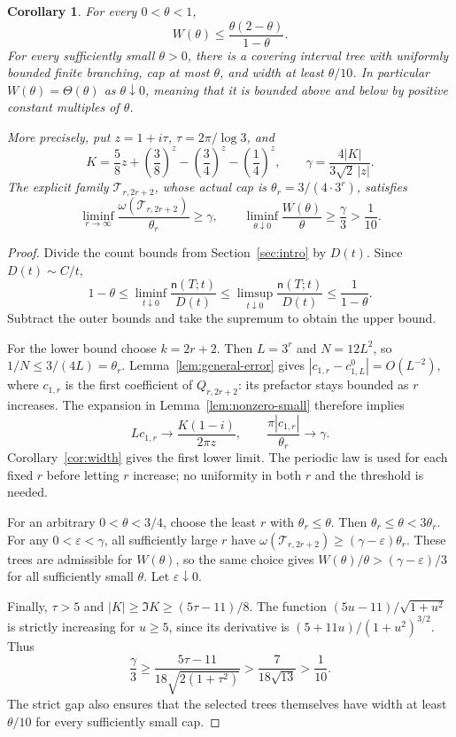 \documentclass[11pt]{article}
\newtheorem{corollary}[theorem]{Corollary}
\theoremstyle{definition}
\theoremstyle{remark}
\newcommand{\cyl}{\mathcal T}
\newcommand{\ncount}{\mathsf n}
\begin{document}
\begin{corollary}\label{cor:theta-order}
For every $0<\theta<1$,
\[
 W(\theta)\le\frac{\theta(2-\theta)}{1-\theta}.
\]
For every sufficiently small $\theta>0$, there is a covering interval
tree with uniformly bounded finite branching, cap at most $\theta$, and
width at least $\theta/10$. In particular $W(\theta)=\Theta(\theta)$ as
$\theta\downarrow0$, meaning that it is bounded above and below by
positive constant multiples of $\theta$.

More precisely, put $z=1+i\tau$, $\tau=2\pi/\log3$, and
\[
 K=\frac58z+\left(\frac38\right)^z
       -\left(\frac34\right)^z-\left(\frac14\right)^z,
 \qquad \gamma=\frac{4|K|}{3\sqrt2\,|z|}.
\]
The explicit family $\cyl_{r,2r+2}$, whose actual cap is
$\theta_r=3/(4\cdot3^r)$, satisfies
\[
 \liminf_{r\to\infty}\frac{\omega(\cyl_{r,2r+2})}{\theta_r}\ge\gamma,
 \qquad
 \liminf_{\theta\downarrow0}\frac{W(\theta)}{\theta}
 \ge\frac\gamma3>\frac1{10}.
\]
\end{corollary}
\begin{proof}
Divide the count bounds from Section~\ref{sec:intro} by $D(t)$.
Since $D(t)\sim C/t$,
\[
 1-\theta\le\liminf_{t\downarrow0}\frac{\ncount(T;t)}{D(t)}
 \le\limsup_{t\downarrow0}\frac{\ncount(T;t)}{D(t)}
 \le\frac1{1-\theta}.
\]
Subtract the outer bounds and take the supremum to obtain the upper bound.

For the lower bound choose $k=2r+2$. Then $L=3^r$ and $N=12L^2$,
so $1/N\le3/(4L)=\theta_r$. Lemma~\ref{lem:general-error} gives
$|c_{1,r}-c^0_{1,L}|=O(L^{-2})$, where $c_{1,r}$ is the first
coefficient of $Q_{r,2r+2}$: its prefactor stays bounded as $r$ increases.
The expansion in Lemma~\ref{lem:nonzero-small} therefore implies
\[
 Lc_{1,r}\longrightarrow\frac{K(1-i)}{2\pi z},\qquad
 \frac{\pi|c_{1,r}|}{\theta_r}\longrightarrow\gamma.
\]
Corollary~\ref{cor:width} gives the first lower limit. The periodic law
is used for each fixed $r$ before letting $r$ increase; no uniformity
in both $r$ and the threshold is needed.

For an arbitrary $0<\theta<3/4$, choose the least $r$ with
$\theta_r\le\theta$. Then $\theta_r\le\theta<3\theta_r$.
For any $0<\varepsilon<\gamma$, all sufficiently large $r$ have
$\omega(\cyl_{r,2r+2})\ge(\gamma-\varepsilon)\theta_r$.
These trees are admissible for $W(\theta)$, so the same choice gives
$W(\theta)/\theta>(\gamma-\varepsilon)/3$ for all sufficiently small
$\theta$. Let $\varepsilon\downarrow0$.

Finally, $\tau>5$ and $|K|\ge\Im K\ge(5\tau-11)/8$. The function
$(5u-11)/\sqrt{1+u^2}$ is strictly increasing for $u\ge5$, since its
derivative is $(5+11u)/(1+u^2)^{3/2}$. Thus
\[
 \frac\gamma3\ge\frac{5\tau-11}{18\sqrt{2(1+\tau^2)}}
 >\frac7{18\sqrt{13}}>\frac1{10}.
\]
The strict gap also ensures that the selected trees themselves have
width at least $\theta/10$ for every sufficiently small cap.
\end{proof}
\end{document}
